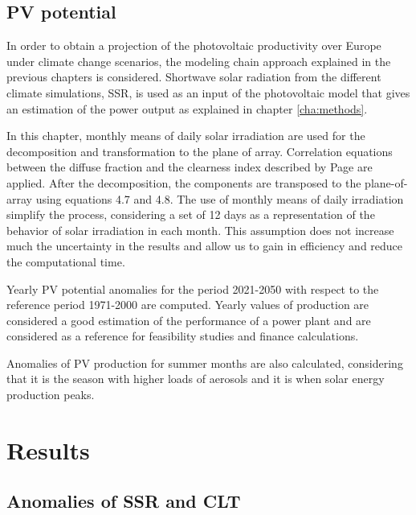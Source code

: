 \subsection{PV potential}

In order to obtain a projection of the photovoltaic productivity over Europe under climate change scenarios, the modeling chain approach explained in the previous chapters is considered. Shortwave solar radiation from the different climate simulations, SSR, is used as an input of the photovoltaic model that gives an estimation of the power output as explained in chapter \ref{cha:methods}.


In this chapter, monthly means of daily solar irradiation are used for the decomposition and transformation to the plane of array. Correlation equations between the diffuse fraction and the clearness index described by Page are applied. After the decomposition, the components are transposed to the plane-of-array using equations 4.7 and 4.8. The use of monthly means of daily irradiation simplify the process, considering a set of 12 days as a representation of the behavior of solar irradiation in each month. This assumption does not increase much the uncertainty in the results and allow us to gain in efficiency and reduce the computational time.

Yearly PV potential anomalies for the period 2021-2050 with respect to the reference period 1971-2000 are computed. Yearly values of production are considered a good estimation of the performance of a power plant and are considered as a reference for feasibility studies and finance calculations.

Anomalies of PV production for summer months are also calculated, considering that it is the season with higher loads of aerosols and it is when solar energy production peaks.

{\section{Results}\label{Results}}

\subsection{Anomalies of SSR and CLT}

